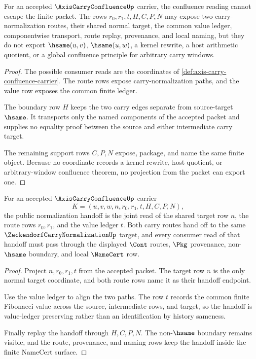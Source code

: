 \begin{theorem}
\label{thm:axis-carry-confluence-nonescape}
For an accepted $\AxisCarryConfluenceUp$ carrier, the confluence reading cannot escape the finite packet. The rows $r_0,r_1,t,H,C,P,N$ may expose two carry-normalization routes, their shared normal target, the common value ledger, componentwise transport, route replay, provenance, and local naming, but they do not export $\hsame(u,v)$, $\hsame(u,w)$, a kernel rewrite, a host arithmetic quotient, or a global confluence principle for arbitrary carry windows.
\end{theorem}
\begin{proof}
The possible consumer reads are the coordinates of \autoref{def:axis-carry-confluence-carrier}. The route rows expose carry-normalization paths, and the value row exposes the common finite ledger.

The boundary row $H$ keeps the two carry edges separate from source-target $\hsame$. It transports only the named components of the accepted packet and supplies no equality proof between the source and either intermediate carry target.

The remaining support rows $C,P,N$ expose, package, and name the same finite object. Because no coordinate records a kernel rewrite, host quotient, or arbitrary-window confluence theorem, no projection from the packet can export one.
\end{proof}

\begin{theorem}
\label{thm:axis-carry-confluence-normalization-handoff}
For an accepted $\AxisCarryConfluenceUp$ carrier
$$
K=(u,v,w,n,r_0,r_1,t,H,C,P,N),
$$
the public normalization handoff is the joint read of the shared target row $n$, the route rows $r_0,r_1$, and the value ledger $t$. Both carry routes hand off to the same $\ZeckendorfCarryNormalizationUp$ target, and every consumer read of that handoff must pass through the displayed $\Cont$ routes, $\Pkg$ provenance, non-$\hsame$ boundary, and local $\NameCert$ row.
\end{theorem}
\begin{proof}
Project $n,r_0,r_1,t$ from the accepted packet. The target row $n$ is the only normal target coordinate, and both route rows name it as their handoff endpoint.

Use the value ledger to align the two paths. The row $t$ records the common finite Fibonacci value across the source, intermediate rows, and target, so the handoff is value-ledger preserving rather than an identification by history sameness.

Finally replay the handoff through $H,C,P,N$. The non-$\hsame$ boundary remains visible, and the route, provenance, and naming rows keep the handoff inside the finite NameCert surface.
\end{proof}

